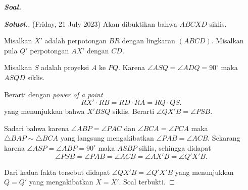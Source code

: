 \textbf{\textit{Soal. }}

\begin{proof}[\textbf{Solusi.}]
(Friday, 21 July 2023)
Akan dibuktikan bahwa $ABCXD$ siklis. 

Misalkan $X'$ adalah perpotongan $BR$ dengan lingkaran $(ABCD)$. Misalkan pula $Q'$ perpotongan $AX'$ dengan $CD$.

Misalkan $S$ adalah proyeksi $A$ ke $PQ$. Karena $\angle ASQ = \angle ADQ = 90^\circ$ maka $ASQD$ siklis.

% 


Berarti dengan \textit{power of a point}
$$RX'\cdot RB = RD\cdot RA = RQ\cdot QS.$$
yang menunjukkan bahwa $X'BSQ$ siklis. Berarti $\angle QX'B = \angle PSB$.

Sadari bahwa karena $\angle ABP = \angle PAC$ dan $\angle BCA = \angle PCA$ maka $\triangle BAP \sim \triangle BCA$ yang langsung mengakibatkan $\angle PAB = \angle ACB$.
Sekarang karena $\angle ASP = \angle ABP = 90^\circ$ maka $ASBP$ siklis, sehingga didapat $$\angle PSB = \angle PAB = \angle ACB = \angle AX'B = \angle Q'X'B.$$

Dari kedua fakta tersebut didapat $\angle QX'B = \angle Q'X'B$ yang menunjukkan $Q = Q'$ yang mengakibatkan $X = X'$. Soal terbukti.
\end{proof}




